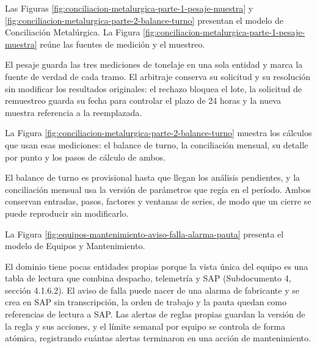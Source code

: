 \documentclass[subdoc]{../../comun/overfore}
\begin{document}
Las Figuras \ref{fig:conciliacion-metalurgica-parte-1-pesaje-muestra} y \ref{fig:conciliacion-metalurgica-parte-2-balance-turno} presentan el modelo de Conciliación Metalúrgica. La Figura \ref{fig:conciliacion-metalurgica-parte-1-pesaje-muestra} reúne las fuentes de medición y el muestreo.

El pesaje guarda las tres mediciones de tonelaje en una sola entidad y marca la fuente de verdad de cada tramo. El arbitraje conserva su solicitud y su resolución sin modificar los resultados originales: el rechazo bloquea el lote, la solicitud de remuestreo guarda su fecha para controlar el plazo de 24 horas y la nueva muestra referencia a la reemplazada.

La Figura \ref{fig:conciliacion-metalurgica-parte-2-balance-turno} muestra los cálculos que usan esas mediciones: el balance de turno, la conciliación mensual, su detalle por punto y los pasos de cálculo de ambos.

El balance de turno es provisional hasta que llegan los análisis pendientes, y la conciliación mensual usa la versión de parámetros que regía en el período. Ambos conservan entradas, pasos, factores y ventanas de series, de modo que un cierre se puede reproducir sin modificarlo.

La Figura \ref{fig:equipos-mantenimiento-aviso-falla-alarma-pauta} presenta el modelo de Equipos y Mantenimiento.

El dominio tiene pocas entidades propias porque la vista única del equipo es una tabla de lectura que combina despacho, telemetría y SAP (Subdocumento 4, sección 4.1.6.2). El aviso de falla puede nacer de una alarma de fabricante y se crea en SAP sin transcripción, la orden de trabajo y la pauta quedan como referencias de lectura a SAP. Las alertas de reglas propias guardan la versión de la regla y sus acciones, y el límite semanal por equipo se controla de forma atómica, registrando cuántas alertas terminaron en una acción de mantenimiento.
\end{document}
